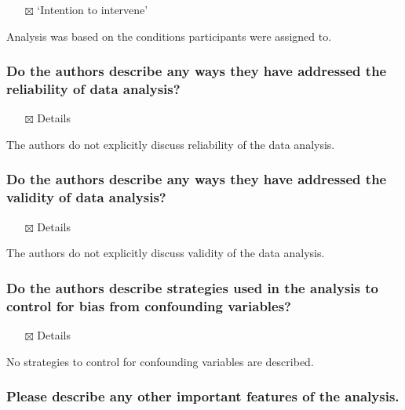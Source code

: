 \documentclass[
  doc, a4paper]{apa7}
\providecommand{\tightlist}{%
  \setlength{\itemsep}{0pt}\setlength{\parskip}{0pt}}
\begin{document}
\begin{itemize}
\tightlist
\item[$\boxtimes$]
  `Intention to intervene'
\end{itemize}

Analysis was based on the conditions participants were assigned to.

\subsubsection{Do the authors describe any ways they have addressed the reliability of data analysis?}\label{do-the-authors-describe-any-ways-they-have-addressed-the-reliability-of-data-analysis}

\begin{itemize}
\tightlist
\item[$\boxtimes$]
  Details
\end{itemize}

The authors do not explicitly discuss reliability of the data analysis.

\subsubsection{Do the authors describe any ways they have addressed the validity of data analysis?}\label{do-the-authors-describe-any-ways-they-have-addressed-the-validity-of-data-analysis}

\begin{itemize}
\tightlist
\item[$\boxtimes$]
  Details
\end{itemize}

The authors do not explicitly discuss validity of the data analysis.

\subsubsection{Do the authors describe strategies used in the analysis to control for bias from confounding variables?}\label{do-the-authors-describe-strategies-used-in-the-analysis-to-control-for-bias-from-confounding-variables}

\begin{itemize}
\tightlist
\item[$\boxtimes$]
  Details
\end{itemize}

No strategies to control for confounding variables are described.

\subsubsection{Please describe any other important features of the analysis.}\label{please-describe-any-other-important-features-of-the-analysis.}
\end{document}
